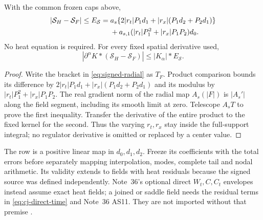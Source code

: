 \begin{proposition}\label{prop:signed-source}
With the common frozen caps above,
\begin{align}
 |\mathcal S_H-\mathcal S_F|\le E_{\mathcal S}
 ={}&a_s\{2|r_t|P_1d_1+|r_x|(P_1d_2+P_2d_1)\}\notag\\
 &+a_{s,1}(|r_t|P_1^2+|r_x|P_1P_2)d_0.
 \label{eq:signed-source-bound}
\end{align}
No heat equation is required. For every fixed spatial derivative used,
\begin{equation}
 |\partial^\alpha K*(\mathcal S_H-\mathcal S_F)|
                    \le|K_\alpha|*E_{\mathcal S}.
 \label{eq:signed-source-filter}
\end{equation}
\end{proposition}
\begin{proof}
Write the bracket in \eqref{eq:signed-radial} as $T_F$.
Product comparison bounds its difference by
$2|r_t|P_1d_1+|r_x|(P_1d_2+P_2d_1)$ and its modulus by
$|r_t|P_1^2+|r_x|P_1P_2$. The real gradient norm of the radial map
$A_s(|F|)$ is $|A_s'|$ along the field segment, including its smooth
limit at zero. Telescope $A_sT$ to prove the first inequality. Transfer
the derivative of the entire product to the fixed kernel for the second.
Thus the varying $r_t,r_x$ stay inside the full-support integral; no
regulator derivative is omitted or replaced by a center value.
\end{proof}
The row is a positive linear map in $d_0,d_1,d_2$. Freeze its coefficients
with the total errors before separately mapping interpolation, modes,
complete tail and nodal arithmetic. Its validity extends to fields with
heat residuals because the signed source was defined independently.
Note~36's optional direct $W_t,C,C_t$ envelopes instead assume exact heat
fields; a joined or saddle field needs the residual terms in
\eqref{eq:cj-direct-time} and Note~36 AS11. They are not imported without
that premise \cite{n36}.

